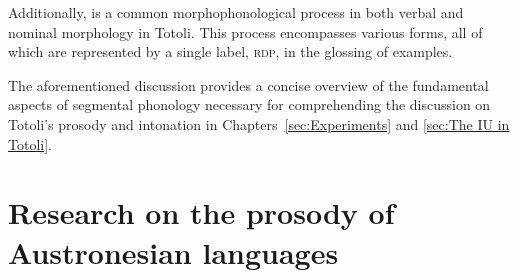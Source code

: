 Additionally,  is a common morphophonological process in both verbal and nominal morphology in Totoli. This process encompasses various forms, all of which are represented by a single label, \textsc{rdp}, in the glossing of examples.


The aforementioned discussion provides a concise overview of the fundamental aspects of segmental phonology necessary for comprehending the discussion on Totoli's prosody and intonation in Chapters~\ref{sec:Experiments} and \ref{sec:The IU in Totoli}. 







\section[Prosody of Austronesian languages]{Research on the prosody of Austronesian languages}
\label{Introduction}


